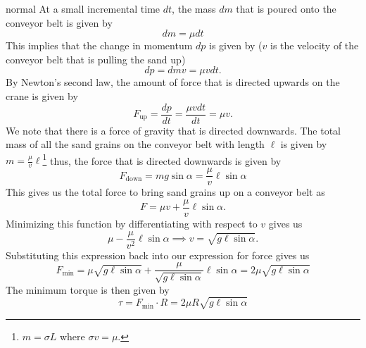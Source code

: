 \begin{solution}{normal}
At a small incremental time $dt$, the mass $dm$ that is poured onto the conveyor belt is given by
\[
dm = \mu dt
\]This implies that the change in momentum $dp$ is given by ($v$ is the velocity of the conveyor belt that is pulling the sand up)
\[
dp = dm v = \mu v dt.
\]By Newton's second law, the amount of force that is directed upwards on the crane is given by
\[
F_{\text{up}} = \frac{dp}{dt} = \frac{\mu v dt}{dt} = \mu v.
\]We note that there is a force of gravity that is directed downwards. The total mass of all the sand grains on the conveyor belt with length $\ell$ is given by $m = \frac{\mu}{v}\ell$\footnote{$m=\sigma L$ where $\sigma v = \mu$.} thus, the force that is directed downwards is given by
\[F_{\text{down}} = mg\sin\alpha = \frac{\mu}{v}\ell\sin\alpha
\]This gives us the total force to bring sand grains up on a conveyor belt as
\[F = \mu v + \frac{\mu}{v}\ell\sin\alpha.
\]Minimizing this function by differentiating with respect to $v$ gives us
\[
\mu - \frac{\mu}{v^2}\ell\sin\alpha\implies v = \sqrt{g\ell\sin\alpha}.
\]Substituting this expression back into our expression for force gives us
\[
F_{\text{min}} = \mu\sqrt{g\ell\sin\alpha} + \frac{\mu}{\sqrt{g\ell\sin\alpha}}\ell\sin\alpha = 2\mu\sqrt{g\ell\sin\alpha}
\]The minimum torque is then given by
\[\tau = F_{\text{min}}\cdot R = \boxed{2\mu R\sqrt{g\ell\sin\alpha}}\]
\end{solution}
